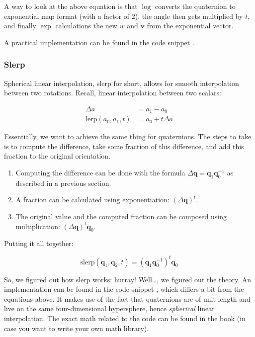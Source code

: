 A way to look at the above equation is that $\log$ converts the quaternion to exponential map format (with a factor of 2), the angle then gets multiplied by $t$, and finally $\exp$ calculations the new $w$ and $\textbf{v}$ from the exponential vector.

A practical implementation can be found in the code snippet .

\subsubsection{Slerp}

Spherical linear interpolation, slerp for short, allows for smooth interpolation between two rotations. Recall, linear interpolation between two scalars:

\begin{align*}
\Delta a &= a_1 - a_0 \\
\text{lerp}(a_0, a_1, t) &= a_0 + t \Delta a
\end{align*}

Essentially, we want to achieve the same thing for quaternions. The steps to take is to compute the difference, take some fraction of this difference, and add this fraction to the original orientation.

\begin{enumerate}
	\item Computing the difference can be done with the formula $\Delta \textbf{q} = \textbf{q}_1\textbf{q}_0^{-1}$ as described in a previous section.
	\item A fraction can be calculated using exponentiation: $(\Delta \textbf{q})^t$.
	\item The original value and the computed fraction can be composed using multiplication: $(\Delta \textbf{q})^t\textbf{q}_0$.
\end{enumerate}

\noindent Putting it all together:

$$\text{slerp}(\textbf{q}_1,\textbf{q}_2,t)=(\textbf{q}_1\textbf{q}_0^{-1})^t\textbf{q}_0$$

So, we figured out how slerp works: hurray! Well\dots, we figured out the theory. An implementation can be found in the code snippet , which differs a bit from the equations above. It makes use of the fact that quaternions are of unit length and live on the same four-dimensional hypersphere, hence \textit{spherical} linear interpolation. The exact math related to the code can be found in the book (in case you want to write your own math library).
